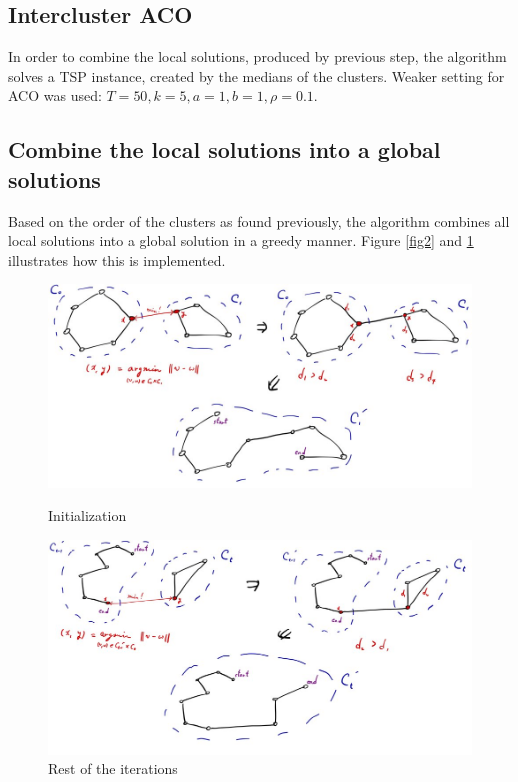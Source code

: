 \documentclass[a4paper]{article}
\begin{document}
\subsection{Intercluster ACO}
In order to combine the local solutions, produced by previous step, the algorithm solves a TSP instance, created by the medians of the clusters.
Weaker setting for ACO was used: $T = 50, k = 5, a = 1, b = 1, \rho = 0.1$.


\subsection{Combine the local solutions into a global solutions}
Based on the order of the clusters as found previously, the algorithm combines all local solutions into a global solution in a greedy manner.
Figure \ref{fig2} and \ref{fig3} illustrates how this is implemented.
\begin{figure}[htp]
	\centering
	\includegraphics[width=\textwidth]{Figures/fig2.jpg}
	\caption{Initialization}
	\label{fig2}
	
	\vspace{2cm}%
	
	\includegraphics[width=\textwidth]{Figures/fig3.jpg}
	\caption{Rest of the iterations}
	\label{fig3}
	
\end{figure}
\end{document}
